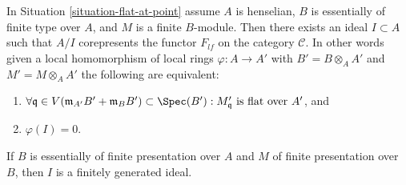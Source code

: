 \begin{theorem}
\label{theorem-flattening-local}
In
Situation \ref{situation-flat-at-point}
assume $A$ is henselian, $B$ is essentially of finite type over $A$, and
$M$ is a finite $B$-module. Then there exists an ideal
$I \subset A$ such that $A/I$ corepresents the functor $F_{lf}$ on the category
$\mathcal{C}$. In other words given a local homomorphism of local rings
$\varphi : A \to A'$ with $B' = B \otimes_A A'$ and $M' = M \otimes_A A'$
the following are equivalent:
\begin{enumerate}
\item $\forall \mathfrak q \in V(\mathfrak m_{A'}B' + \mathfrak m_B B')
\subset \Spec(B') :
M'_{\mathfrak q}\text{ is flat over }A'$, and
\item $\varphi(I) = 0$.
\end{enumerate}
If $B$ is essentially of finite presentation over $A$ and $M$
of finite presentation over $B$, then $I$ is a finitely generated ideal.
\end{theorem}

